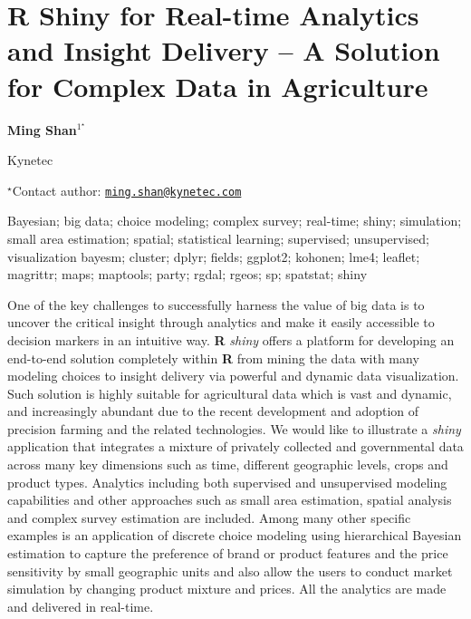 \documentclass[\main/boa.tex]{subfiles}
\begin{document}
\pagestyle{empty}

\section{R Shiny for Real-time Analytics and Insight Delivery -- A Solution for
Complex Data in Agriculture}

\begin{center}
  {\bf Ming Shan$^{1^\star}$}
\end{center}

\vskip 0.3cm

\begin{affiliations}
\begin{enumerate}
\begin{minipage}{0.915\textwidth}
\centering
\item Kynetec \\[-2pt]
\end{minipage}
\end{enumerate}
$^\star$Contact author: \href{mailto:ming.shan@kynetec.com}{\nolinkurl{ming.shan@kynetec.com}}\\
\end{affiliations}

\vskip 0.5cm

\begin{minipage}{0.915\textwidth}
\keywords Bayesian; big data; choice modeling; complex survey; real-time; shiny;
simulation; small area estimation; spatial; statistical learning;
supervised; unsupervised; visualization
\packages bayesm; cluster; dplyr; fields; ggplot2; kohonen; lme4; leaflet;
magrittr; maps; maptools; party; rgdal; rgeos; sp; spatstat; shiny
\end{minipage}

\vskip 0.8cm

One of the key challenges to successfully harness the value of big data
is to uncover the critical insight through analytics and make it easily
accessible to decision markers in an intuitive way. \textbf{R}
\emph{shiny} offers a platform for developing an end-to-end solution
completely within \textbf{R} from mining the data with many modeling
choices to insight delivery via powerful and dynamic data visualization.
Such solution is highly suitable for agricultural data which is vast and
dynamic, and increasingly abundant due to the recent development and
adoption of precision farming and the related technologies. We would
like to illustrate a \emph{shiny} application that integrates a mixture
of privately collected and governmental data across many key dimensions
such as time, different geographic levels, crops and product types.
Analytics including both supervised and unsupervised modeling
capabilities and other approaches such as small area estimation, spatial
analysis and complex survey estimation are included. Among many other
specific examples is an application of discrete choice modeling using
hierarchical Bayesian estimation to capture the preference of brand or
product features and the price sensitivity by small geographic units and
also allow the users to conduct market simulation by changing product
mixture and prices. All the analytics are made and delivered in
real-time.
\end{document}
